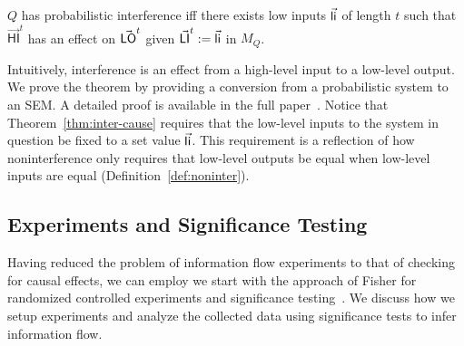 \documentclass[10pt, onecolumn]{report}
\begin{document}
\begin{theorem}\label{thm:inter-cause}
$Q$ has probabilistic interference iff there exists low inputs $\vec{\mathsf{li}}$ of length $t$ such that 
 $\vec{\mathsf{HI}}^{t}$ has an effect on $\vec{\mathsf{LO}}^{t}$ given $\vec{\mathsf{LI}}^{t} := \vec{\mathsf{li}}$ in $M_Q$.  
\end{theorem}

Intuitively, interference is an effect from a high-level input to a low-level output. 
We prove the theorem by providing a conversion from a probabilistic system to 
an SEM. A detailed proof is available in the full paper~\cite{tschantz2015methodology}.
Notice that Theorem~\ref{thm:inter-cause} requires that the low-level 
inputs to the system in question be fixed to a set value $\vec{\mathsf{li}}$.  
This requirement is a reflection of how noninterference only 
requires that low-level outputs be equal when low-level inputs 
are equal (Definition~\ref{def:noninter}).

\subsection{Experiments and Significance Testing}

Having reduced the problem of information flow experiments to that of 
checking for causal effects, we can employ we start with the approach of 
Fisher for randomized controlled experiments and significance testing~\cite{fisher35doe}.
We discuss how we setup experiments and analyze the collected data using
significance tests to infer information flow.
\end{document}
